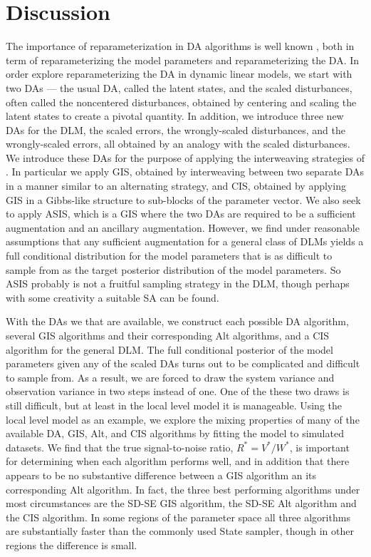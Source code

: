 \documentclass[12pt]{article}
\begin{document}
\section{Discussion}\label{sec:Discuss}

The importance of reparameterization in DA algorithms is well known \citep{papaspiliopoulos2007general}, both in term of reparameterizing the model parameters and reparameterizing the DA. In order explore reparameterizing the DA in dynamic linear models, we start with two DAs --- the usual DA, called the latent states, and the scaled disturbances, often called the noncentered disturbances, obtained by centering and scaling the latent states to create a pivotal quantity. In addition, we introduce three new DAs for the DLM, the scaled errors, the wrongly-scaled disturbances, and the wrongly-scaled errors, all obtained by an analogy with the scaled disturbances. We introduce these DAs for the purpose of applying the interweaving strategies of \citet{yu2011center}. In particular we apply GIS, obtained by interweaving between two separate DAs in a manner similar to an alternating strategy, and CIS, obtained by applying GIS in a Gibbs-like structure to sub-blocks of the parameter vector. We also seek to apply ASIS, which is a GIS where the two DAs are required to be a sufficient augmentation and an ancillary augmentation. However, we find under reasonable assumptions that any sufficient augmentation for a general class of DLMs yields a full conditional distribution for the model parameters that is as difficult to sample from as the target posterior distribution of the model parameters. So ASIS probably is not a fruitful sampling strategy in the DLM, though perhaps with some creativity a suitable SA can be found.

With the DAs we that are available, we construct each possible DA algorithm, several GIS algorithms and their corresponding Alt algorithms, and a CIS algorithm for the general DLM. The full conditional posterior of the model parameters given any of the scaled DAs turns out to be complicated and difficult to sample from. As a result, we are forced to draw the system variance and observation variance in two steps instead of one. One of the these two draws is still difficult, but at least in the local level model it is manageable. Using the local level model as an example, we explore the mixing properties of many of the available DA, GIS, Alt, and CIS algorithms by fitting the model to simulated datasets. We find that the true signal-to-noise ratio, $R^*=V^*/W^*$, is important for determining when each algorithm performs well, and in addition that there appears to be no substantive difference between a GIS algorithm an its corresponding Alt algorithm. In fact, the three best performing algorithms under most circumstances are the SD-SE GIS algorithm, the SD-SE Alt algorithm and the CIS algorithm. In some regions of the parameter space all three algorithms are substantially faster than the commonly used State sampler, though in other regions the difference is small.
\end{document}
